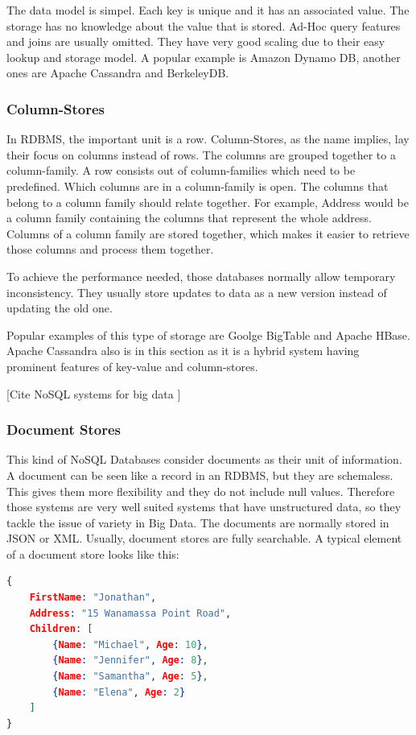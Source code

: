 \documentclass{acm_proc_article-sp}
\begin{document}
The data model is simpel. Each key is unique and it has an associated value. The storage has no knowledge about the value that is stored. Ad-Hoc query features and joins are usually omitted. They have very good scaling due to their easy lookup and storage model. A popular example is Amazon Dynamo DB, another ones are Apache Cassandra and BerkeleyDB.
	
\subsubsection{Column-Stores}

In RDBMS, the important unit is a row. Column-Stores, as the name implies, lay their focus on columns instead of rows. The columns are grouped together to a column-family. A row consists out of column-families which need to be predefined. Which columns are in a column-family is open. The columns that belong to a column family should relate together. For example, Address would be a column family containing the columns that represent the whole address. Columns of a column family are stored together, which makes it easier to retrieve those columns and process them together.

To achieve the performance needed, those databases normally allow temporary inconsistency. They usually store updates to data as a new version instead of updating the old one.

Popular examples of this type of storage are Goolge BigTable and Apache HBase. Apache Cassandra also is in this section as it is a hybrid system having prominent features of key-value and column-stores.

[Cite NoSQL systems for big data ]

\subsubsection{Document Stores}

This kind of NoSQL Databases consider documents as their unit of information. A
document can be seen like a record in an RDBMS, but they are schemaless. This
gives them more flexibility and they do not include null values. Therefore those systems are very well suited systems that have unstructured data, so they tackle the issue of variety in Big Data.
The documents are normally stored in JSON or XML. Usually, document stores are fully searchable. A typical element of a document store looks
like this:

\begin{lstlisting}[language=json,firstnumber=1]
{
	FirstName: "Jonathan",
	Address: "15 Wanamassa Point Road",
	Children: [
		{Name: "Michael", Age: 10},
		{Name: "Jennifer", Age: 8},
		{Name: "Samantha", Age: 5},
		{Name: "Elena", Age: 2}
	]
}
\end{lstlisting}
\end{document}
